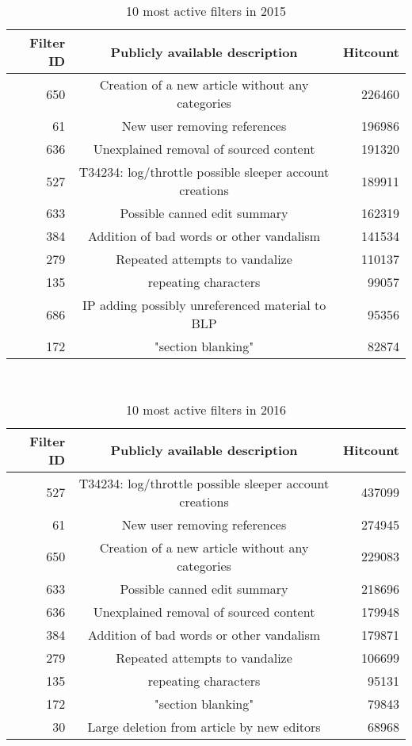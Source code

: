 \begin{table}
  \centering
  \begin{tabular}{r c r }
    Filter ID & Publicly available description & Hitcount \\
    \hline
    650 & Creation of a new article without any categories & 226460 \\
    61 & New user removing references & 196986 \\
    636 & Unexplained removal of sourced content & 191320 \\
    527 & T34234: log/throttle possible sleeper account creations & 189911 \\
    633 & Possible canned edit summary & 162319 \\
    384 & Addition of bad words or other vandalism & 141534 \\
    279 & Repeated attempts to vandalize & 110137 \\
    135 & repeating characters & 99057 \\
    686 & IP adding possibly unreferenced material to BLP & 95356 \\
    172 & "section blanking" & 82874 \\
  \end{tabular}
  \caption{10 most active filters in 2015}~\label{tab:most-active-2015}
\end{table}

\begin{table}
  \centering
  \begin{tabular}{r c r }
    Filter ID & Publicly available description & Hitcount \\
    \hline
    527 & T34234: log/throttle possible sleeper account creations & 437099 \\
    61 & New user removing references & 274945 \\
    650 & Creation of a new article without any categories & 229083 \\
    633 & Possible canned edit summary & 218696 \\
    636 & Unexplained removal of sourced content & 179948 \\
    384 & Addition of bad words or other vandalism & 179871 \\
    279 & Repeated attempts to vandalize & 106699 \\
    135 & repeating characters & 95131 \\
    172 & "section blanking" & 79843 \\
    30 & Large deletion from article by new editors & 68968 \\
  \end{tabular}
  \caption{10 most active filters in 2016}~\label{tab:most-active-2016}
\end{table}

